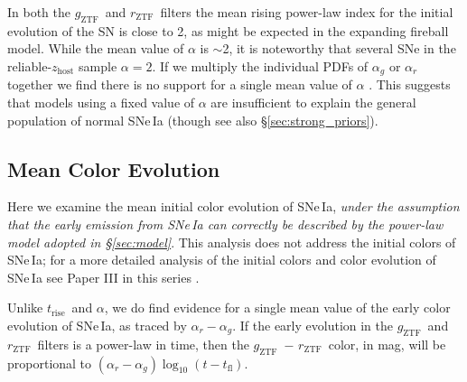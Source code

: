 \documentclass[twocolumn]{./aastex63}
\newcommand{\rztf}{$r_\mathrm{ZTF}$}
\newcommand{\gztf}{$g_\mathrm{ZTF}$}
\newcommand{\trise}{$t_\mathrm{rise}$}
\begin{document}
In both the \gztf\ and \rztf\ filters the mean rising power-law index for the
initial evolution of the SN is close to 2, as might be expected in the
expanding fireball model. While the mean value of $\alpha$ is $\sim$2, it is
noteworthy that several SNe in the reliable-$z_\mathrm{host}$ sample
 $\alpha = 2$. If we multiply the
individual PDFs of $\alpha_g$ or $\alpha_r$ together we find there is no
support for a single mean value of $\alpha$ . This
suggests that models using a fixed value of $\alpha$ are insufficient to
explain the general population of normal SNe\,Ia (though see also
\S\ref{sec:strong_priors}).



\subsection{Mean Color Evolution}\label{sec:colors}

Here we examine the mean initial color evolution of SNe\,Ia, \textit{under the
assumption that the early emission from SNe\,Ia can correctly be described by
the power-law model adopted in \S\ref{sec:model}}. This analysis does not
address the initial colors of SNe\,Ia; for a more detailed analysis of the
initial colors and color evolution of SNe\,Ia see Paper III in this series
\citep{Bulla20}.

Unlike \trise\ and $\alpha$, we do find evidence for a single mean value of
the early color evolution of SNe\,Ia, as traced by $\alpha_r - \alpha_g$. If
the early evolution in the \gztf\ and \rztf\ filters is a power-law in time,
then the \gztf\ $-$ \rztf\ color, in mag, will be proportional to $(\alpha_r -
\alpha_g) \log_{10} (t - t_\mathrm{fl})$.
\end{document}
